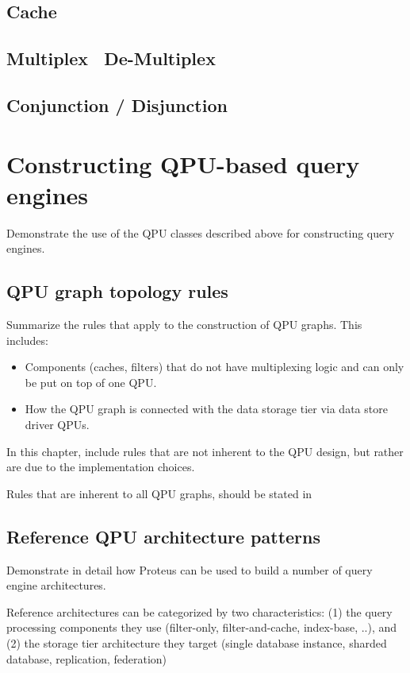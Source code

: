 \subsection{Cache}

\subsection{Multiplex \ De-Multiplex}

\subsection{Conjunction / Disjunction}


\section{Constructing QPU-based query engines}
Demonstrate the use of the QPU classes described above for constructing query
engines.

\subsection{QPU graph topology rules}
Summarize the rules that apply to the construction of QPU graphs.
This includes:
\begin{itemize}
  \item Components (caches, filters) that do not have multiplexing logic and can
  only be put on top of one QPU.
  \item How the QPU graph is connected with the data storage tier via data store
  driver QPUs.
\end{itemize}

In this chapter, include rules that are not inherent to the QPU design, but
rather are due to the implementation choices.

Rules that are inherent to all QPU graphs, should be stated in


\subsection{Reference QPU architecture patterns}
Demonstrate in detail how Proteus can be used to build a number of query engine
architectures.

Reference architectures can be categorized by two characteristics: (1) the query
processing components they use (filter-only, filter-and-cache, index-base, ..),
and (2) the storage tier architecture they target (single database instance,
sharded database, replication, federation)

